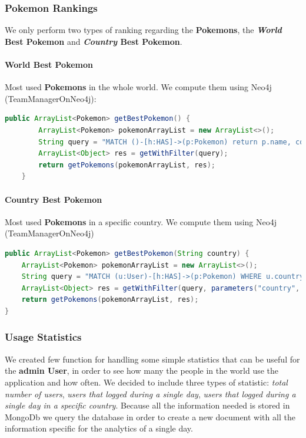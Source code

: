\subsubsection{Pokemon Rankings}
We only perform two types of ranking regarding the \textbf{Pokemons}, the \textbf{\textit{World} Best Pokemon} and \textbf{\textit{Country} Best Pokemon}.

\paragraph{World Best Pokemon}
Most used \textbf{Pokemons} in the whole world. We compute them using Neo4j (TeamManagerOnNeo4j):

\begin{lstlisting}[language=Java]
	public ArrayList<Pokemon> getBestPokemon() {
		ArrayList<Pokemon> pokemonArrayList = new ArrayList<>();
		String query = "MATCH ()-[h:HAS]->(p:Pokemon) return p.name, count(h) AS held, p.sprite ORDER BY held DESC LIMIT " +  + ConfigDataHandler.getInstance().configData.numRowsRanking;
		ArrayList<Object> res = getWithFilter(query);
		return getPokemons(pokemonArrayList, res);
	}
\end{lstlisting}

\paragraph{Country Best Pokemon}
Most used \textbf{Pokemons} in a specific country. We compute them using Neo4j (TeamManagerOnNeo4j)

\begin{lstlisting}[language=Java]
public ArrayList<Pokemon> getBestPokemon(String country) {
	ArrayList<Pokemon> pokemonArrayList = new ArrayList<>();
	String query = "MATCH (u:User)-[h:HAS]->(p:Pokemon) WHERE u.country = $country return p.name, count(h) AS held, p.sprite ORDER BY held DESC LIMIT " + ConfigDataHandler.getInstance().configData.numRowsRanking;
	ArrayList<Object> res = getWithFilter(query, parameters("country", country));
	return getPokemons(pokemonArrayList, res);
}
\end{lstlisting}

\subsubsection{Usage Statistics}
We created few function for handling some simple statistics that can be useful for the \textbf{admin User}, in order to see how many the people in the world use the application and how often. We decided to include three types of statistic: \textit{total number of users}, \textit{users that logged during a single day}, \textit{users that logged during a single day in a specific country}. Because all the information needed is stored in MongoDb we query the database in order to create a new document with all the information specific for the analytics of a single day.

